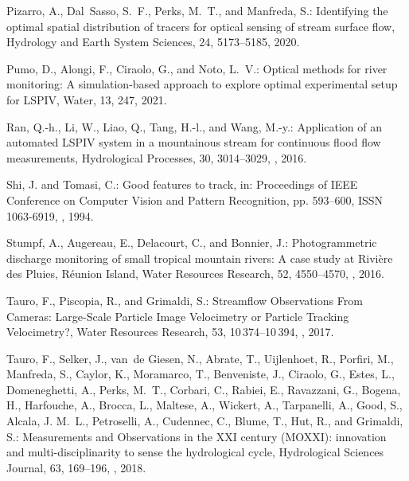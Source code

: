\documentclass[hess, manuscript]{copernicus} %
\begin{document}
\begin{thebibliography}{68}
Pizarro, A., Dal~Sasso, S.~F., Perks, M.~T., and Manfreda, S.: Identifying the
  optimal spatial distribution of tracers for optical sensing of stream surface
  flow, Hydrology and Earth System Sciences, 24, 5173--5185,
  2020{}.

Pumo, D., Alongi, F., Ciraolo, G., and Noto, L.~V.: Optical methods for river
  monitoring: A simulation-based approach to explore optimal experimental setup
  for LSPIV, Water, 13, 247, 2021.

Ran, Q.-h., Li, W., Liao, Q., Tang, H.-l., and Wang, M.-y.: Application of an
  automated LSPIV system in a mountainous stream for continuous flood flow
  measurements, Hydrological Processes, 30, 3014--3029,
  , 2016.

Shi, J. and Tomasi, C.: Good features to track, in: Proceedings of IEEE
  Conference on Computer Vision and Pattern Recognition, pp. 593--600, ISSN
  1063-6919, , 1994.

Stumpf, A., Augereau, E., Delacourt, C., and Bonnier, J.: Photogrammetric
  discharge monitoring of small tropical mountain rivers: A case study at
  Rivière des Pluies, Réunion Island, Water Resources Research, 52,
  4550--4570, , 2016.

Tauro, F., Piscopia, R., and Grimaldi, S.: Streamflow Observations From
  Cameras: Large-Scale Particle Image Velocimetry or Particle Tracking
  Velocimetry?, Water Resources Research, 53, 10\,374--10\,394,
  , 2017.

Tauro, F., Selker, J., van~de Giesen, N., Abrate, T., Uijlenhoet, R., Porfiri,
  M., Manfreda, S., Caylor, K., Moramarco, T., Benveniste, J., Ciraolo, G.,
  Estes, L., Domeneghetti, A., Perks, M.~T., Corbari, C., Rabiei, E.,
  Ravazzani, G., Bogena, H., Harfouche, A., Brocca, L., Maltese, A., Wickert,
  A., Tarpanelli, A., Good, S., Alcala, J. M.~L., Petroselli, A., Cudennec, C.,
  Blume, T., Hut, R., and Grimaldi, S.: Measurements and Observations in the
  XXI century (MOXXI): innovation and multi-disciplinarity to sense the
  hydrological cycle, Hydrological Sciences Journal, 63, 169--196,
  , 2018{}.


\end{thebibliography}
\end{document}
